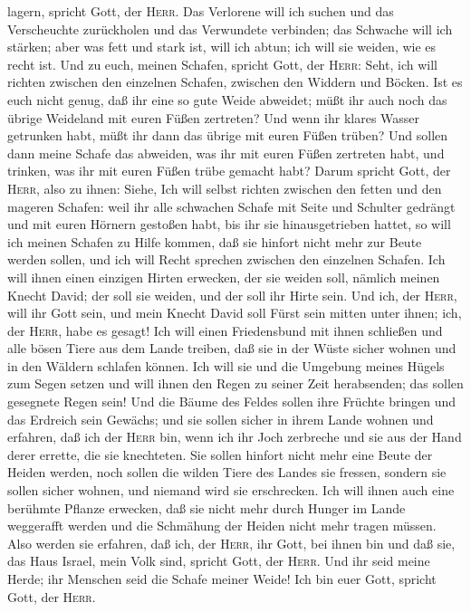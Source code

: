 lagern, spricht Gott, der \textsc{Herr}.  Das Verlorene
will ich suchen und das Verscheuchte zurückholen und das Verwundete
verbinden; das Schwache will ich stärken; aber was fett und stark ist,
will ich abtun; ich will sie weiden, wie es recht ist. 
Und zu euch, meinen Schafen, spricht Gott, der \textsc{Herr}: Seht, ich
will richten zwischen den einzelnen Schafen, zwischen den Widdern und
Böcken.  Ist es euch nicht genug, daß ihr eine so gute
Weide abweidet; müßt ihr auch noch das übrige Weideland mit euren Füßen
zertreten? Und wenn ihr klares Wasser getrunken habt, müßt ihr dann das
übrige mit euren Füßen trüben?  Und sollen dann meine
Schafe das abweiden, was ihr mit euren Füßen zertreten habt, und
trinken, was ihr mit euren Füßen trübe gemacht habt? 
Darum spricht Gott, der \textsc{Herr}, also zu ihnen: Siehe, Ich will
selbst richten zwischen den fetten und den mageren Schafen:
 weil ihr alle schwachen Schafe mit Seite und Schulter
gedrängt und mit euren Hörnern gestoßen habt, bis ihr sie
hinausgetrieben hattet,  so will ich meinen Schafen zu
Hilfe kommen, daß sie hinfort nicht mehr zur Beute werden sollen, und
ich will Recht sprechen zwischen den einzelnen Schafen. 
Ich will ihnen einen einzigen Hirten erwecken, der sie weiden soll,
nämlich meinen Knecht David; der soll sie weiden, und der soll ihr Hirte
sein.  Und ich, der \textsc{Herr}, will ihr Gott sein,
und mein Knecht David soll Fürst sein mitten unter ihnen; ich, der
\textsc{Herr}, habe es gesagt!  Ich will einen
Friedensbund mit ihnen schließen und alle bösen Tiere aus dem Lande
treiben, daß sie in der Wüste sicher wohnen und in den Wäldern schlafen
können.  Ich will sie und die Umgebung meines Hügels zum
Segen setzen und will ihnen den Regen zu seiner Zeit herabsenden; das
sollen gesegnete Regen sein!  Und die Bäume des Feldes
sollen ihre Früchte bringen und das Erdreich sein Gewächs; und sie
sollen sicher in ihrem Lande wohnen und erfahren, daß ich der
\textsc{Herr} bin, wenn ich ihr Joch zerbreche und sie aus der Hand
derer errette, die sie knechteten.  Sie sollen hinfort
nicht mehr eine Beute der Heiden werden, noch sollen die wilden Tiere
des Landes sie fressen, sondern sie sollen sicher wohnen, und niemand
wird sie erschrecken.  Ich will ihnen auch eine berühmte
Pflanze erwecken, daß sie nicht mehr durch Hunger im Lande weggerafft
werden und die Schmähung der Heiden nicht mehr tragen müssen.
 Also werden sie erfahren, daß ich, der \textsc{Herr},
ihr Gott, bei ihnen bin und daß sie, das Haus Israel, mein Volk sind,
spricht Gott, der \textsc{Herr}.  Und ihr seid meine
Herde; ihr Menschen seid die Schafe meiner Weide! Ich bin euer Gott,
spricht Gott, der \textsc{Herr}.

